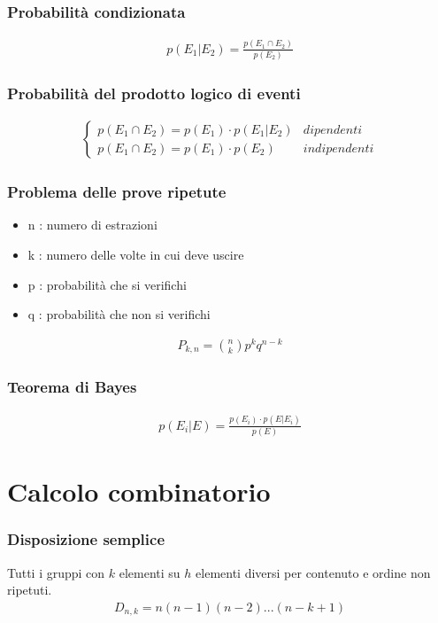 \documentclass[a4paper]{article}
\begin{document}
	\subsubsection*{Probabilità condizionata}
	\begin{align*}
		p(E_1 | E_2) = \frac{p(E_1 \cap E_2)}{p(E_2)}
	\end{align*}
	
	\subsubsection*{Probabilità del prodotto logico di eventi}
	\begin{align*}
		\begin{cases}
		p(E_1 \cap E_2) = p(E_1) \cdot p(E_1 | E_2)	& dipendenti\\
		p(E_1 \cap E_2) = p(E_1) \cdot p(E_2)		& indipendenti
		\end{cases}
	\end{align*}
	
	\subsubsection*{Problema delle prove ripetute}
	\begin{itemize}
		\item n : numero di estrazioni
		\item k : numero delle volte in cui deve uscire
		\item p : probabilità che si verifichi
		\item q : probabilità che non si verifichi
	\end{itemize}

	\begin{align*}
		P_{k,n} = {{n}\choose{k}} p^kq^{n-k}
	\end{align*}
	
	\subsubsection*{Teorema di Bayes}
	\begin{align*}
		p(E_i|E)= \frac{p(E_i) \cdot p(E | E_i)}{p(E)}
	\end{align*}
	
	\newpage
	\section{Calcolo combinatorio}
	\subsubsection*{Disposizione semplice}
	Tutti i gruppi con $k$ elementi su $h$ elementi diversi per contenuto e ordine non ripetuti.
	\begin{align*}
		D_{n,k} = n(n-1)(n-2)...(n-k+1)
	\end{align*}
\end{document}
